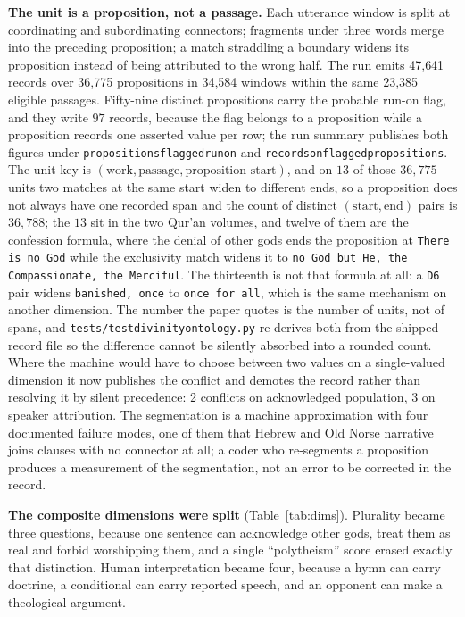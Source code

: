 \documentclass[11pt]{article}
\DeclareRobustCommand{\_}{\textunderscore\allowbreak}
\newcommand{\dimkey}[1]{\texttt{\small #1}}
\newcommand{\field}[1]{\texttt{\small #1}}
\begin{document}
\textbf{The unit is a proposition, not a passage.} Each utterance window is split
at coordinating and subordinating connectors; fragments under three words merge
into the preceding proposition; a match straddling a boundary widens its
proposition instead of being attributed to the wrong half. The run emits 47{,}641
records over 36{,}775 propositions in 34{,}584 windows within the same 23{,}385
eligible passages. Fifty-nine distinct propositions carry the probable run-on flag, and they
write \(97\) records, because the flag belongs to a proposition while a proposition records
one asserted value per row; the run summary publishes both figures under
\field{propositions\_flagged\_run\_on} and \field{records\_on\_flagged\_propositions}. The unit key
is \((\text{work},\text{passage},\text{proposition start})\), and on
\(13\) of those \(36{,}775\) units two matches at the same start widen to different ends,
so a proposition does not always have one recorded span and the count of distinct
\((\text{start},\text{end})\) pairs is \(36{,}788\); the \(13\) sit in the two Qur'an
volumes, and twelve of them are the confession formula, where the denial of other gods ends
the proposition at \texttt{There is no God} while the exclusivity match widens it to
\texttt{no God but He, the Compassionate, the Merciful}. The thirteenth is not that formula at
all: a \dimkey{D6} pair widens \texttt{banished, once} to \texttt{once for all}, which is the
same mechanism on another dimension. The number the paper quotes is the number of units, not of spans,
and \texttt{tests/test\_divinity\_ontology.py} re-derives both from the shipped record file so the
difference cannot be silently absorbed into a rounded count.
Where the machine would have to choose between two values on a single-valued
dimension it now publishes the conflict and demotes the record rather than
resolving it by silent precedence: 2 conflicts on acknowledged population, 3 on
speaker attribution. The segmentation is a machine approximation with four
documented failure modes, one of them that Hebrew and Old Norse narrative joins
clauses with no connector at all; a coder who re-segments a proposition produces
a measurement of the segmentation, not an error to be corrected in the record.

\textbf{The composite dimensions were split} (Table~\ref{tab:dims}). Plurality
became three questions, because one sentence can acknowledge other gods, treat
them as real and forbid worshipping them, and a single ``polytheism'' score erased
exactly that distinction. Human interpretation became four, because a hymn can
carry doctrine, a conditional can carry reported speech, and an opponent can make
a theological argument.
\end{document}
